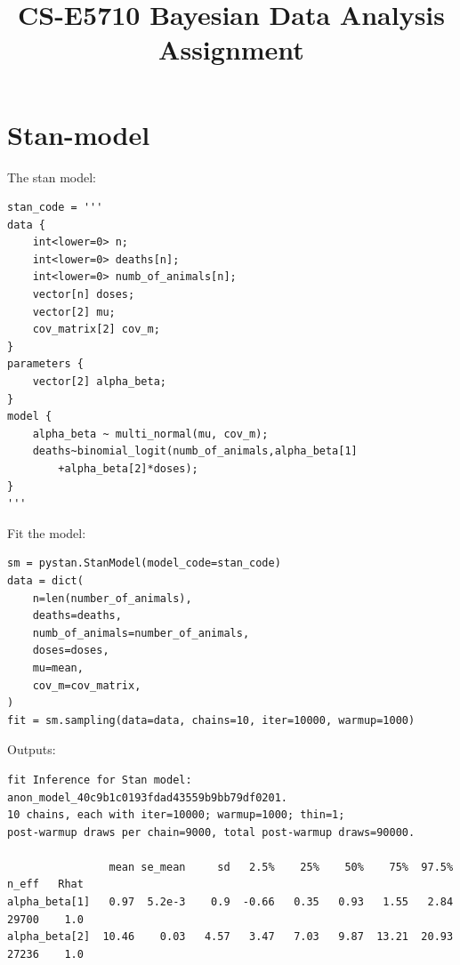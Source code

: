 \documentclass{article}
\begin{document}
\title{CS-E5710 Bayesian Data Analysis\\Assignment }                  
\maketitle



\section{Stan-model}
The stan model:
\begin{verbatim}  
stan_code = '''
data {
    int<lower=0> n;
    int<lower=0> deaths[n];
    int<lower=0> numb_of_animals[n];
    vector[n] doses;
    vector[2] mu;
    cov_matrix[2] cov_m;
}
parameters {
    vector[2] alpha_beta;
}
model {
    alpha_beta ~ multi_normal(mu, cov_m);
    deaths~binomial_logit(numb_of_animals,alpha_beta[1]
    	+alpha_beta[2]*doses);
}
'''
\end{verbatim}
Fit the model:
\begin{verbatim}  
sm = pystan.StanModel(model_code=stan_code)
data = dict(
    n=len(number_of_animals),
    deaths=deaths,
    numb_of_animals=number_of_animals,
    doses=doses,
    mu=mean,
    cov_m=cov_matrix,
)
fit = sm.sampling(data=data, chains=10, iter=10000, warmup=1000)
\end{verbatim}
Outputs:
\begin{verbatim}  
fit Inference for Stan model: anon_model_40c9b1c0193fdad43559b9bb79df0201.
10 chains, each with iter=10000; warmup=1000; thin=1; 
post-warmup draws per chain=9000, total post-warmup draws=90000.

                mean se_mean     sd   2.5%    25%    50%    75%  97.5%  n_eff   Rhat
alpha_beta[1]   0.97  5.2e-3    0.9  -0.66   0.35   0.93   1.55   2.84  29700    1.0
alpha_beta[2]  10.46    0.03   4.57   3.47   7.03   9.87  13.21  20.93  27236    1.0
\end{verbatim}
\end{document}
